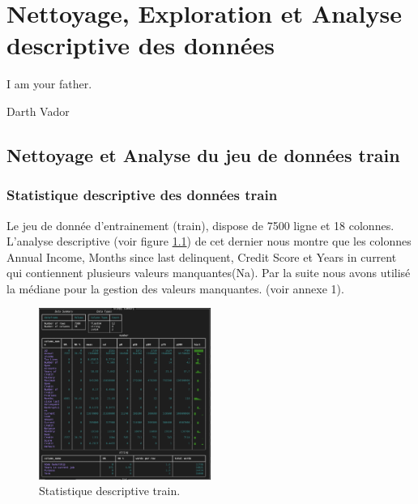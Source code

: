 
\chapter{Nettoyage, Exploration et Analyse descriptive des données}
\epigraph{I am your father.}{Darth Vador}
\minitoc
\newpage
\section{Nettoyage et Analyse du jeu de données train}


\subsection{Statistique descriptive des données train }
Le jeu de donnée d'entrainement (train), dispose de 7500 ligne et 18 colonnes. L'analyse descriptive (voir figure \ref{fig:stat_descriptive}) de cet dernier nous montre que les colonnes Annual Income, Months since last delinquent, Credit Score et Years in current qui contiennent plusieurs valeurs manquantes(Na). Par la suite nous avons utilisé la médiane pour la gestion des valeurs manquantes. (voir annexe 1).

\begin{figure}[h]
\centering
\includegraphics[width=0.5\textwidth]{figures/fig1.png}
\caption{Statistique descriptive train.}
\label{fig:stat_descriptive}
\end{figure}

